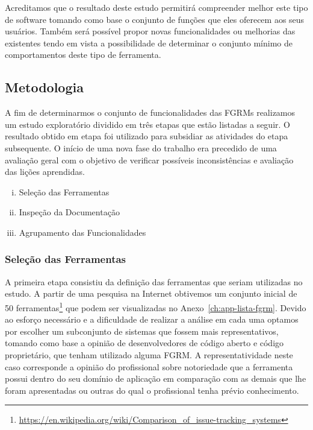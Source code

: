 Acreditamos que o resultado deste estudo permitirá compreender melhor este tipo
de software tomando como base o conjunto de funções que eles oferecem aos seus
usuários. Também será possível propor novas funcionalidades ou melhorias das
existentes tendo em vista a possibilidade de determinar o conjunto mínimo de
comportamentos deste tipo de ferramenta.

\subsection{Metodologia}
\label{subsec:metodologia}

A fim de determinarmos o conjunto de funcionalidades das FGRMs realizamos um
estudo exploratório dividido em três etapas que estão listadas a seguir. O
resultado obtido em etapa foi utilizado para subsidiar as atividades do etapa
subsequente. O início de uma nova fase do trabalho era precedido de uma
avaliação geral com o objetivo de verificar possíveis inconsistências e
avaliação das lições aprendidas.

\begin{enumerate}[(i)]
	\item Seleção das Ferramentas
	\item Inspeção da Documentação
	\item Agrupamento das Funcionalidades
\end{enumerate}

\subsubsection{Seleção das Ferramentas}
\label{subsubsec:selecao-ferramentas}

A primeira etapa consistiu da definição das ferramentas que seriam utilizadas no
estudo. A partir de uma pesquisa na Internet obtivemos um conjunto inicial de 50
ferramentas\footnote{\url{https://en.wikipedia.org/wiki/Comparison_of_issue-tracking_systems}}
que podem ser visualizadas no Anexo~\ref{ch:app-lista-fgrm}. Devido ao esforço
necessário e a dificuldade de realizar a análise em cada uma optamos por
escolher um subconjunto de sistemas que fossem mais representativos, tomando
como base a opinião de desenvolvedores de código aberto e código proprietário,
que tenham utilizado alguma FGRM. A representatividade neste caso corresponde a
opinião do profissional sobre notoriedade que a ferramenta possui dentro do seu
domínio de aplicação em comparação com as demais que lhe foram apresentadas ou
outras do qual o profissional tenha prévio conhecimento.


